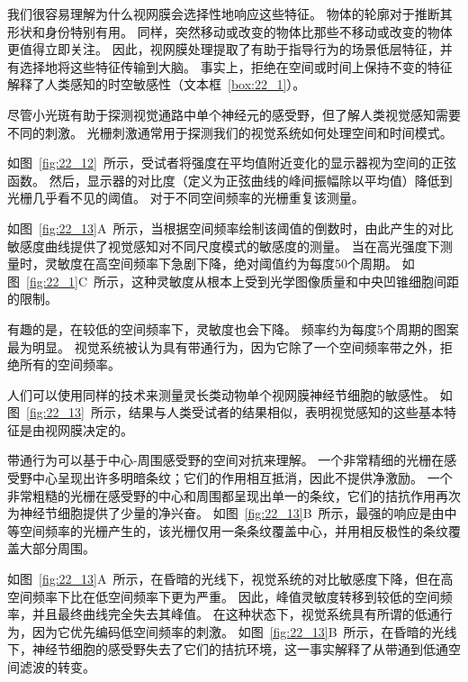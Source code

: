 我们很容易理解为什么视网膜会选择性地响应这些特征。 
物体的轮廓对于推断其形状和身份特别有用。
同样，突然移动或改变的物体比那些不移动或改变的物体更值得立即关注。
因此，视网膜处理提取了有助于指导行为的场景低层特征，并有选择地将这些特征传输到大脑。
事实上，拒绝在空间或时间上保持不变的特征解释了人类感知的时空敏感性（文本框~\ref{box:22_1}）。


\begin{proposition}[人类感知的时空敏感性] \label{box:22_1}
	
	\quad \quad 尽管小光斑有助于探测视觉通路中单个神经元的感受野，但了解人类视觉感知需要不同的刺激。
	光栅刺激通常用于探测我们的视觉系统如何处理空间和时间模式。
	
	\quad \quad 如图~\ref{fig:22_12}~所示，受试者将强度在平均值附近变化的显示器视为空间的正弦函数。
	然后，显示器的对比度（定义为正弦曲线的峰间振幅除以平均值）降低到光栅几乎看不见的阈值。
	对于不同空间频率的光栅重复该测量。
	
	\quad \quad 如图~\ref{fig:22_13}A~所示，当根据空间频率绘制该阈值的倒数时，由此产生的对比敏感度曲线提供了视觉感知对不同尺度模式的敏感度的测量。
	当在高光强度下测量时，灵敏度在高空间频率下急剧下降，绝对阈值约为每度50个周期。
	如图~\ref{fig:22_1}C~所示，这种灵敏度从根本上受到光学图像质量和中央凹锥细胞间距的限制。
	
	\quad \quad 有趣的是，在较低的空间频率下，灵敏度也会下降。
	频率约为每度5个周期的图案最为明显。
	视觉系统被认为具有带通行为，因为它除了一个空间频率带之外，拒绝所有的空间频率。
	
	\quad \quad 人们可以使用同样的技术来测量灵长类动物单个视网膜神经节细胞的敏感性。
	如图~\ref{fig:22_13}~所示，结果与人类受试者的结果相似，表明视觉感知的这些基本特征是由视网膜决定的。
	
	\quad \quad 带通行为可以基于中心-周围感受野的空间对抗来理解。
	一个非常精细的光栅在感受野中心呈现出许多明暗条纹；它们的作用相互抵消，因此不提供净激励。
	一个非常粗糙的光栅在感受野的中心和周围都呈现出单一的条纹，它们的拮抗作用再次为神经节细胞提供了少量的净兴奋。
	如图~\ref{fig:22_13}B~所示，最强的响应是由中等空间频率的光栅产生的，该光栅仅用一条条纹覆盖中心，并用相反极性的条纹覆盖大部分周围。
	
	\quad \quad 如图~\ref{fig:22_13}A~所示，在昏暗的光线下，视觉系统的对比敏感度下降，但在高空间频率下比在低空间频率下更为严重。
	因此，峰值灵敏度转移到较低的空间频率，并且最终曲线完全失去其峰值。
	在这种状态下，视觉系统具有所谓的低通行为，因为它优先编码低空间频率的刺激。
	如图~\ref{fig:22_13}B~所示，在昏暗的光线下，神经节细胞的感受野失去了它们的拮抗环境，这一事实解释了从带通到低通空间滤波的转变。
	

\end{proposition}
